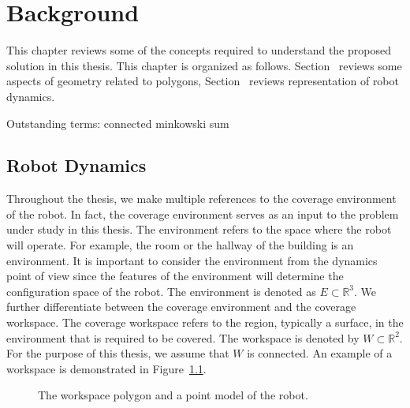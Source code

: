 \documentclass[../main.tex]{subfiles}
\begin{document}
\chapter{Background}
\label{chapter:background}

This chapter reviews some of the concepts required to understand the proposed solution in this thesis. This chapter is organized as follows. Section~ reviews some aspects of geometry related to polygons, Section~ reviews representation of robot dynamics. 

Outstanding terms:
connected
minkowski sum

\section{Robot Dynamics}
\label{section:robot_dynamics}

Throughout the thesis, we make multiple references to the coverage environment of the robot. In fact, the coverage environment serves as an input to the problem under study in this thesis. The environment refers to the space where the robot will operate. For example, the room or the hallway of the building is an environment. It is important to consider the environment from the dynamics point of view since the features of the environment will determine the configuration space of the robot. The environment is denoted as $E\subset\mathbb{R}^3$. We further differentiate between the coverage environment and the coverage workspace. The coverage workspace refers to the region, typically a surface, in the environment that is required to be covered. The workspace is denoted by $W\subset\mathbb{R}^2$. For the purpose of this thesis, we assume that $W$ is connected. An example of a workspace is demonstrated in Figure~\ref{fig:workspace_and_system}.

\begin{figure}
	\centering
	
	\caption{The workspace polygon and a point model of the robot.}
	\label{fig:workspace_and_system}
\end{figure}



\end{document}
